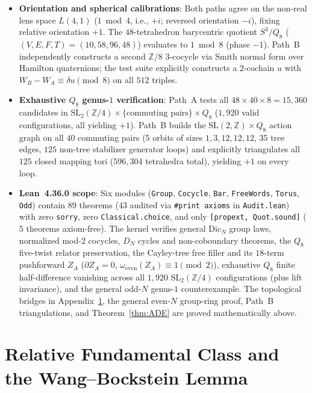 \documentclass[11pt]{amsart}
\theoremstyle{definition}
\theoremstyle{remark}
\newcommand{\Z}{\mathbb{Z}}
\newcommand{\SL}{\mathrm{SL}}
\newcommand{\Dic}{\mathrm{Dic}}
\begin{document}
\begin{itemize}
    \item \textbf{Orientation and spherical calibrations}: Both paths agree on the non-real lens space $L(4,1)$ ($1\bmod 4$, i.e., $+i$; reversed orientation $-i$), fixing relative orientation $+1$. The $48$-tetrahedron barycentric quotient $S^3/Q_8$ ($(V,E,F,T)=(10,58,96,48)$) evaluates to $1 \bmod 8$ (phase $-1$). Path~B independently constructs a second $\Z/8$ $3$-cocycle via Smith normal form over Hamilton quaternions; the test suite explicitly constructs a $2$-cochain $u$ with $W_B - W_A \equiv \delta u \pmod 8$ on all $512$ triples.
    \item \textbf{Exhaustive $Q_8$ genus-$1$ verification}: Path~A tests all $48 \times 40 \times 8 = 15,360$ candidates in $\SL_2(\Z/4) \times \{\text{commuting pairs}\} \times Q_8$ ($1,920$ valid configurations, all yielding $+1$). Path~B builds the $\SL(2,\Z) \times Q_8$ action graph on all $40$ commuting pairs ($5$ orbits of sizes $1,3,12,12,12$, $35$ tree edges, $125$ non-tree stabilizer generator loops) and explicitly triangulates all $125$ closed mapping tori ($596,304$ tetrahedra total), yielding $+1$ on every loop.
    \item \textbf{Lean~4.36.0 scope}: Six modules (\texttt{Group}, \texttt{Cocycle}, \texttt{Bar}, \texttt{FreeWords}, \texttt{Torus}, \texttt{Odd}) contain $89$ theorems ($43$ audited via \texttt{\#print axioms} in \texttt{Audit.lean}) with zero \texttt{sorry}, zero \texttt{Classical.choice}, and only \texttt{[propext, Quot.sound]} ($5$ theorems axiom-free). The kernel verifies general $\Dic_N$ group laws, normalized mod-$2$ cocycles, $D_N$ cycles and non-coboundary theorems, the $Q_8$ five-twist relator preservation, the Cayley-tree free filler and its $18$-term pushforward $Z_A$ ($\partial Z_A=0$, $\omega_{\mathrm{even}}(Z_A)\equiv 1\pmod 2$), exhaustive $Q_8$ finite half-difference vanishing across all $1,920$ $\SL_2(\Z/4)$ configurations (plus lift invariance), and the general odd-$N$ genus-$1$ counterexample. The topological bridges in Appendix~\ref{app:wang}, the general even-$N$ group-ring proof, Path~B triangulations, and Theorem~\ref{thm:ADE} are proved mathematically above.
\end{itemize}

\appendix
\section{Relative Fundamental Class and the Wang--Bockstein Lemma}\label{app:wang}
\end{document}
